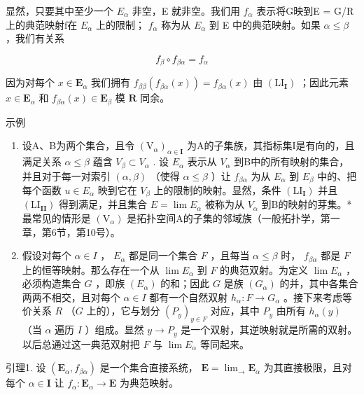 显然，只要其中至少一个 \(E_{\alpha}\) 非空，E 就非空。我们用 \(f_{\alpha}\) 表示将G映到E = G/R上的典范映射f在 \(E_{\alpha}\) 上的限制； \(f_{\alpha}\) 称为从 \(E_{\alpha}\) 到 E 中的典范映射。如果 \(\alpha \leqslant \beta\) ，我们有关系

\[
f _ {\beta} \circ f _ {\beta \alpha} = f _ {\alpha}\tag{22}
\]

因为对每个 \(x \in \mathbf{E}_{\alpha}\) 我们拥有 \(f_{\beta \beta}(f_{\beta \alpha}(x)) = f_{\beta \alpha}(x)\) 由 \((\mathrm{LI}_{\mathbf{I}})\) ；因此元素 \(x \in \mathbf{E}_{\alpha}\) 和 \(f_{\beta \alpha}(x) \in \mathbf{E}_{\beta}\) 模 \(\mathbf{R}\) 同余。

示例

\begin{enumerate}
\def\labelenumi{(\arabic{enumi})}
\item
  设A、B为两个集合，且令 \((\mathrm{V}_{\alpha})_{\alpha\in\mathbf{I}}\) 为A的子集族，其指标集I是有向的，且满足关系 \(\alpha\leqslant\beta\) 蕴含 \(V_{\beta}\subset V_{\alpha}\) . 设 \(E_{\alpha}\) 表示从 \(V_{\alpha}\) 到B中的所有映射的集合，并且对于每一对索引 \((\alpha,\beta)\) （使得 \(\alpha\leqslant\beta\) ）让 \(f_{\beta\alpha}\) 为从 \(E_{\alpha}\) 到 \(E_{\beta}\) 中的、把每个函数 \(u\in E_{\alpha}\) 映到它在 \(V_{\beta}\) 上的限制的映射。显然，条件 \((\mathrm{LI}_{\mathbf{I}})\) 并且 \((\mathrm{LI}_{\mathbf{II}})\) 得到满足，并且集合 \(E=\lim E_{\alpha}\) 被称为从 \(V_{\alpha}\) 到B的映射的芽集。*最常见的情形是 \((\mathrm{V}_{\alpha})\) 是拓扑空间A的子集的邻域族（一般拓扑学，第一章，第6节，第10号）。
\item
  假设对每个 \(\alpha \in I\) ， \(E_{\alpha}\) 都是同一个集合 \(F\) ，且每当 \(\alpha \leqslant \beta\) 时， \(f_{\beta \alpha}\) 都是 \(F\) 上的恒等映射。那么存在一个从 \(\lim E_{\alpha}\) 到 \(F\) 的典范双射。为定义 \(\lim E_{\alpha}\) ，必须构造集合 \(G\) ，即族 \((E_{\alpha})\) 的和；因此 \(G\) 是族 \((G_{\alpha})\) 的并，其中各集合两两不相交，且对每个 \(\alpha \in I\) 都有一个自然双射 \(h_{\alpha}: F \to G_{\alpha}\) 。接下来考虑等价关系 \(R\) （\(G\) 上的），它与划分 \((P_{y})_{y \in F}\) 对应，其中 \(P_{y}\) 由所有 \(h_{\alpha}(y)\) （当 \(\alpha\) 遍历 \(I\) ）组成。显然 \(y \to P_{y}\) 是一个双射，其逆映射就是所需的双射。以后总通过这一典范双射把 \(F\) 与 \(\lim E_{\alpha}\) 等同起来。
\end{enumerate}

引理1. 设 \((\mathbf{E}_{\alpha}, f_{\beta \alpha})\) 是一个集合直接系统， \(\mathbf{E} = \lim_{\rightarrow} \mathbf{E}_{\alpha}\) 为其直接极限，且对每个 \(\alpha \in \mathbf{I}\) 让 \(f_{\alpha}: \mathbf{E}_{\alpha} \to \mathbf{E}\) 为典范映射。

